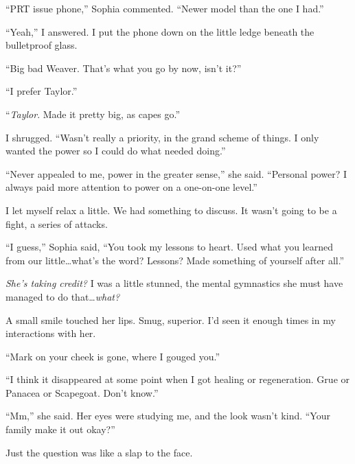``PRT issue phone,'' Sophia commented.  ``Newer model than the one I had.''



``Yeah,'' I answered.  I put the phone down on the little ledge beneath the bulletproof glass.



``Big bad Weaver.  That's what you go by now, isn't it?''



``I prefer Taylor.''



``\emph{Taylor}.  Made it pretty big, as capes go.''



I shrugged.  ``Wasn't really a priority, in the grand scheme of things.  I only wanted the power so I could do what needed doing.''



``Never appealed to me, power in the greater sense,'' she said.  ``Personal power?  I always paid more attention to power on a one-on-one level.''



I let myself relax a little.  We had something to discuss.  It wasn't going to be a fight, a series of attacks.



``I guess,'' Sophia said, ``You took my lessons to heart.  Used what you learned from our little\ldots what's the word?  Lessons?  Made something of yourself after all.''



\emph{She's taking credit?}  I was a little stunned, the mental gymnastics she must have managed to do that\ldots \emph{what?}



A small smile touched her lips.  Smug, superior.  I'd seen it enough times in my interactions with her.



``Mark on your cheek is gone, where I gouged you.''



``I think it disappeared at some point when I got healing or regeneration.  Grue or Panacea or Scapegoat.  Don't know.''



``Mm,'' she said.  Her eyes were studying me, and the look wasn't kind.  ``Your family make it out okay?''



Just the question was like a slap to the face.



